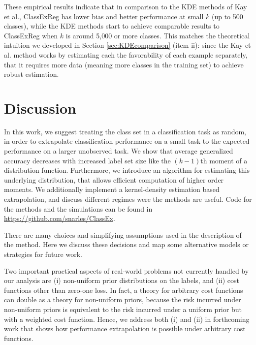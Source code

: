 \documentclass[twoside,11pt]{article}
\begin{document}
These empirical results indicate that in comparison to the KDE methods of Kay et al., ClassExReg has lower bias and better performance at small $k$ (up to 500 classes), while the KDE methods start to achieve comparable results to ClassExReg when $k$ is around 5,000 or more classes.  This matches the theoretical intuition we developed in Section \ref{sec:KDEcomparison} (item ii): since the Kay et al. method works by estimating each the favorability of each example separately, that it requires more data (meaning more classes in the training set) to achieve robust estimation.  %

\section{Discussion}
\label{sec:discussion}
In this work, we suggest treating the class set in a classification
task as random, in order to extrapolate classification performance on
a small task to the expected performance on a larger unobserved task.
We show that average generalized accuracy decreases with increased
label set size like the $(k-1)$th moment of a distribution function.
Furthermore, we introduce an algorithm for estimating this underlying
distribution, that allows efficient computation of higher order
moments. We additionally implement a kernel-density estimation based extrapolation, and discuss different regimes were the methods are useful.  Code for the methods and the simulations can be found in \url{https://github.com/snarles/ClassEx}.

There are many choices and simplifying assumptions used in
the description of the method.  Here we discuss these
decisions and map some alternative models or strategies for future
work.




Two important practical aspects of real-world problems not currently handled by our analysis are (i) non-uniform prior distributions on the labels,
and (ii) cost functions other than zero-one loss.  In fact, a theory for arbitrary cost functions can double as a theory for non-uniform priors, because the risk incurred under
non-uniform priors is equivalent to the risk incurred under a uniform prior but with a weighted cost function.
Hence, we address both (i) and (ii) in forthcoming work that shows how performance extrapolation is possible under arbitrary cost functions. %
\end{document}
